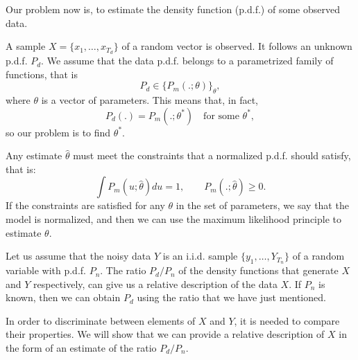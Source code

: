\label{Chapter:NCE}
Our problem now is, to estimate the density function (p.d.f.) of some observed data.

A sample $X = \{x_1,\dots,x_{T_d}\}$ of a random vector is observed. It follows an unknown p.d.f. $P_d$. We assume that the data p.d.f. belongs to a parametrized family of functions, that is
\[
P_d \in \{P_m(.;\theta)\}_\theta,
\]
where $\theta$ is a vector of parameters. This means that, in fact,
$$
P_d(.) = P_m(.;\theta^*) \quad \text{for some } \theta^*,
$$
so our problem is to find $\theta^*$. 

Any estimate $\hat{\theta}$ must meet the constraints that a normalized p.d.f. should satisfy, that is:
$$
\int P_m(u;\hat{\theta})du = 1, \quad \quad P_m(.;\hat{\theta})\geq 0.
$$
If the constraints are satisfied for any $\theta$ in the set of parameters, we say that the model is normalized, and then we can use the maximum likelihood principle to estimate $\theta$.

Let us assume that the noisy data $Y$ is an i.i.d. sample $\{y_1,\dots,Y_{T_n}\}$ of a random variable with p.d.f. $P_n$. The ratio $P_d/P_n$ of the density functions that generate $X$ and $Y$ respectively, can give us a relative description of the data $X$. If $P_n$ is known, then we can obtain $P_d$ using the ratio that we have just mentioned.

In order to discriminate between elements of $X$ and $Y$, it is needed to compare their properties. We will show that we can provide a relative description of $X$ in the form of an estimate of the ratio $P_d/P_n$.

